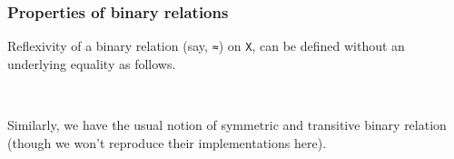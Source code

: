 \documentclass[a4paper,UKenglish,cleveref, autoref, thm-restate]{lipics-v2019}
\begin{document}

\subsubsection{Properties of binary relations}\label{properties-of-binary-relations}
Reflexivity of a binary relation (say, \texttt{≈}) on \texttt{X}, can be defined without an underlying equality as follows.
\begin{code}
\>[0]\AgdaSpace{}%
\AgdaSymbol{:}\AgdaSpace{}%
\AgdaSymbol{\{}\AgdaSpace{}%
\AgdaSymbol{:}\AgdaSpace{}%
\AgdaSpace{}%
\AgdaSpace{}%
\AgdaSymbol{\}}\AgdaSpace{}%
\AgdaSpace{}%
\AgdaSpace{}%
\AgdaSpace{}%
\AgdaSpace{}%
\AgdaSpace{}%
\AgdaSpace{}%
\AgdaSpace{}%
\AgdaSpace{}%
\<%
\\
\>[0]\AgdaSpace{}%
\AgdaSpace{}%
\AgdaSymbol{=}\AgdaSpace{}%
\AgdaSpace{}%
\AgdaSpace{}%
\AgdaSpace{}%
\AgdaSpace{}%
\AgdaSpace{}%
\<%
\end{code}
Similarly, we have the usual notion of symmetric and transitive binary relation (though we won't reproduce their implementations here).
\end{document}
